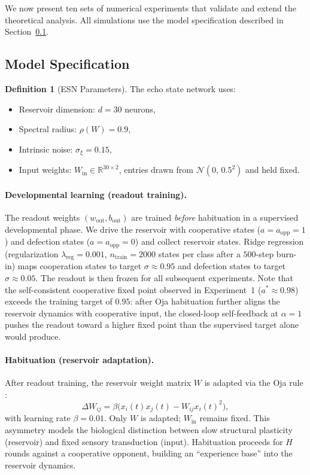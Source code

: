 \documentclass[11pt,a4paper]{article}
\theoremstyle{definition}
\newtheorem{definition}[theorem]{Definition}
\newcommand{\R}{\mathbb{R}}
\newcommand{\Wres}{W}
\newcommand{\Wout}{w_{\mathrm{out}}}
\newcommand{\Win}{W_{\mathrm{in}}}
\newcommand{\bout}{b_{\mathrm{out}}}
\begin{document}
We now present ten sets of numerical experiments that validate and extend
the theoretical analysis.  All simulations use the model specification
described in Section~\ref{sec:model_details}.

\subsection{Model Specification}
\label{sec:model_details}

\begin{definition}[ESN Parameters]
\label{def:esn_params}
The echo state network uses:
\begin{itemize}[nosep]
  \item Reservoir dimension: $d = 30$ neurons,
  \item Spectral radius: $\rho(\Wres) = 0.9$,
  \item Intrinsic noise: $\sigma_{\xi} = 0.15$,
  \item Input weights: $\Win \in \R^{30 \times 2}$, entries drawn from
    $\mathcal{N}(0,\, 0.5^2)$ and held fixed.
\end{itemize}
\end{definition}

\paragraph{Developmental learning (readout training).}
The readout weights $(\Wout, \bout)$ are trained \emph{before} habituation
in a supervised developmental phase.  We drive the reservoir with cooperative
states ($a = a_{\mathrm{opp}} = 1$) and defection states
($a = a_{\mathrm{opp}} = 0$) and collect reservoir states.
Ridge regression (regularization $\lambda_{\mathrm{reg}} = 0.001$,
$n_{\mathrm{train}} = 2000$ states per class after a $500$-step burn-in)
maps cooperation states to target $\sigma \approx 0.95$
and defection states to target $\sigma \approx 0.05$.  The readout is then
frozen for all subsequent experiments.
Note that the self-consistent cooperative fixed point observed in
Experiment~1 ($a^{*} \approx 0.98$) exceeds the training target of
$0.95$: after Oja habituation further aligns the reservoir dynamics
with cooperative input, the closed-loop self-feedback at $\alpha = 1$
pushes the readout toward a higher fixed point than the supervised
target alone would produce.

\paragraph{Habituation (reservoir adaptation).}
After readout training, the reservoir weight matrix $\Wres$ is adapted via
the Oja rule \citep{oja1982}:
\begin{equation}
\label{eq:oja}
\Delta W_{ij} = \beta \bigl(x_i(t) x_j(t) - W_{ij} x_i(t)^2\bigr),
\end{equation}
with learning rate $\beta = 0.01$.  Only $\Wres$ is adapted;
$\Win$ remains fixed.  This asymmetry models the biological distinction
between slow structural plasticity (reservoir) and fixed sensory
transduction (input).  Habituation proceeds for $H$ rounds against a
cooperative opponent, building an ``experience base'' into the reservoir
dynamics.
\end{document}
